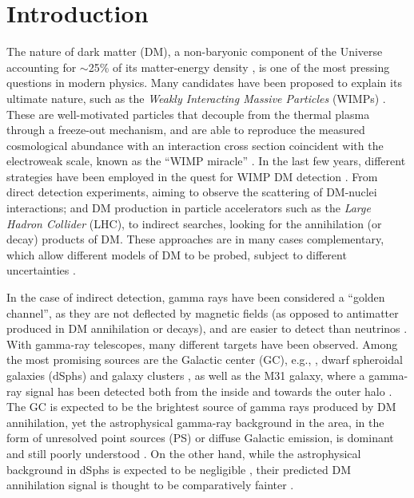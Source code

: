 \documentclass[%
 reprint,
nofootinbib,
 amsmath,amssymb,
 aps,
]{revtex4-2}
\begin{document}
\maketitle


\section{Introduction}
\label{sec:intro}
The nature of dark matter (DM), a non-baryonic component of the Universe accounting for $\sim$25\% of its matter-energy density \cite{Aghanim2020}, is one of the most pressing questions in modern physics. Many candidates have been proposed to explain its ultimate nature, such as the \textit{Weakly Interacting Massive Particles} (WIMPs) \cite{Bertone2010}. These are well-motivated particles that decouple from the thermal plasma through a freeze-out mechanism, and are able to reproduce the measured cosmological abundance with an interaction cross section coincident with the electroweak scale, known as the ``WIMP miracle'' \cite{Bertone+05}. In the last few years, different strategies have been employed in the quest for WIMP DM detection \cite{GarrettDuda09}. From direct detection experiments, aiming to observe the scattering of DM-nuclei interactions; and DM production in particle accelerators such as the \textit{Large Hadron Collider} (LHC), to indirect searches, looking for the annihilation (or decay) products of DM. These approaches are in many cases complementary, which allow different models of DM to be probed, subject to different uncertainties \cite{Schumann2019, Kahlhoefer2017, Gaskins2016}.

In the case of indirect detection, gamma rays have been considered a ``golden channel'', as they are not deflected by magnetic fields (as opposed to antimatter produced in DM annihilation or decays), and are easier to detect than neutrinos \cite{Conrad2017}. With gamma-ray telescopes, many different targets have been observed. Among the most promising sources are the Galactic center (GC), e.g., \cite{fermi_gc_paper16,fermi_gc_paper17, Abdallah2016, CTA_GC_2020}, dwarf spheroidal galaxies (dSphs) \cite{Ackermann2015, Oakes2019, MAGIC_fermi_dsphs16} and galaxy clusters \cite{fermi_cluster_paper, Ackermann_2010, Acciari_2018}, as well as the M31 galaxy, where a gamma-ray signal has been detected both from the inside and towards the outer halo \cite{Ackermann_2017, Karwin_2019, Karwin_2021}. The GC is expected to be the brightest source of gamma rays produced by DM annihilation, yet the astrophysical gamma-ray background in the area, in the form of unresolved point sources (PS) or diffuse Galactic emission, is dominant and still poorly understood \cite{fermi_gc_pulsar_paper,Bartels2017}. On the other hand, while the astrophysical background in dSphs is expected to be negligible \cite{2016ApJ...832L...6W}, their predicted DM annihilation signal is thought to be comparatively fainter \cite{2017ApJ...834..110A, Pace_2018, 2020ARNPS..70..455M}.
\end{document}
